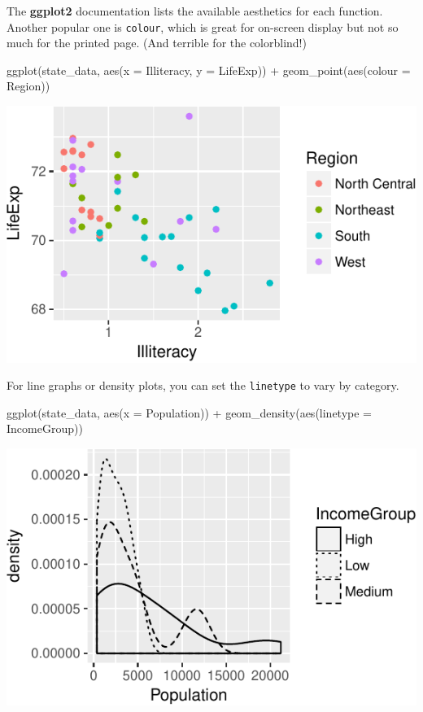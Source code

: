 \documentclass[
  12pt,
  oneside,openany]{book}
\newenvironment{Shaded}{\begin{snugshade}}{\end{snugshade}}
\newcommand{\AttributeTok}[1]{\textcolor[rgb]{0.77,0.63,0.00}{#1}}
\newcommand{\FunctionTok}[1]{\textcolor[rgb]{0.00,0.00,0.00}{#1}}
\newcommand{\NormalTok}[1]{#1}
\newcommand{\SpecialCharTok}[1]{\textcolor[rgb]{0.00,0.00,0.00}{#1}}
\begin{document}
The \textbf{ggplot2} documentation lists the available aesthetics for each function. Another popular one is \texttt{colour}, which is great for on-screen display but not so much for the printed page. (And terrible for the colorblind!)

\begin{Shaded}
\begin{Highlighting}[]
\FunctionTok{ggplot}\NormalTok{(state\_data, }\FunctionTok{aes}\NormalTok{(}\AttributeTok{x =}\NormalTok{ Illiteracy, }\AttributeTok{y =}\NormalTok{ LifeExp)) }\SpecialCharTok{+}
  \FunctionTok{geom\_point}\NormalTok{(}\FunctionTok{aes}\NormalTok{(}\AttributeTok{colour =}\NormalTok{ Region))}
\end{Highlighting}
\end{Shaded}

\includegraphics{pdaps_files/figure-latex/aes-colour-1.pdf}

For line graphs or density plots, you can set the \texttt{linetype} to vary by category.

\begin{Shaded}
\begin{Highlighting}[]
\FunctionTok{ggplot}\NormalTok{(state\_data, }\FunctionTok{aes}\NormalTok{(}\AttributeTok{x =}\NormalTok{ Population)) }\SpecialCharTok{+}
  \FunctionTok{geom\_density}\NormalTok{(}\FunctionTok{aes}\NormalTok{(}\AttributeTok{linetype =}\NormalTok{ IncomeGroup))}
\end{Highlighting}
\end{Shaded}

\includegraphics{pdaps_files/figure-latex/aes-linetype-1.pdf}
\end{document}

